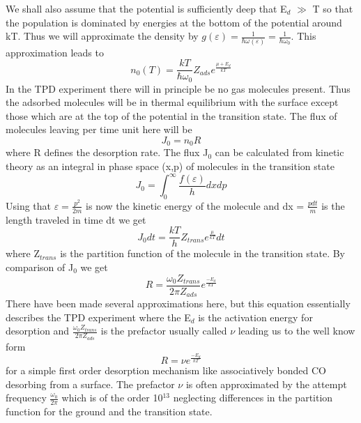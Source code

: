 We shall also  assume that the potential is sufficiently deep that E$_d$ $\gg$ T so that the population is dominated by energies at the bottom of the potential around kT. Thus we will approximate the density by  $g(\varepsilon) = \frac{1}{\hbar \omega(\varepsilon)} =  \frac{1}{\hbar \omega_0}$.
This approximation leads to
\begin{equation}
n_0(T) = \frac{kT}{\hbar \omega_0} Z_{ads} e^{\frac{\mu + E_d}{kT}} 
\end{equation}
In the TPD experiment there will in principle be no gas molecules present.  Thus the adsorbed molecules will be in thermal equilibrium with the surface except those which are at the top of the potential in the transition state. The flux of molecules leaving per time unit  here will be
\begin{equation}
J_0 = n_0 R 
\end{equation}
where R defines the desorption rate. The flux J$_0$ can be calculated from kinetic theory as an integral in phase space (x,p) of molecules in the transition state
\begin{equation}
J_0 = \int_{0}^{\infty}\frac{f(\varepsilon)}{h}dxdp 
\end{equation}
Using that $\varepsilon = \frac{p^2}{2m}$ is now the kinetic energy of the molecule and dx =  $\frac{pdt}{m}$ is the length traveled in time dt we get
\begin{equation}
J_0 dt = \frac{kT}{h}Z_{trans}e^{\frac{\mu}{kT}}dt 
\end{equation}
where Z$_{trans}$ is the partition function of the molecule in the transition state. By comparison of J$_0$ we get 
\begin{equation}
R = \frac{\omega_0 Z_{trans}}{2 \pi Z_{ads}} e^{\frac{-E_{d}}{kT}} 
\end{equation} There have been made several approximations here, but this equation  essentially describes the TPD experiment where the E$_d$ is the activation energy for desorption and $\frac{\omega_0 Z_{trans}}{2 \pi Z_{ads}}$ is the prefactor usually called $\nu$ leading us to the well know form
\begin{equation}
R = \nu e^{\frac{-E_{d}}{kT}}
\end{equation}
for a simple first order desorption mechanism like associatively bonded  CO  desorbing from a surface. The prefactor $\nu$ is often approximated by the attempt frequency $\frac{\omega_0}{2\pi}$ which is of the order 10$^{13}$ neglecting differences in the  partition function for the ground and the transition state.


